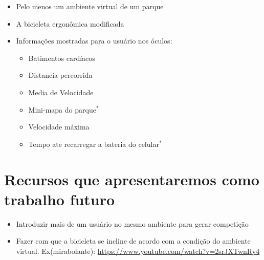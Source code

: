 \begin{itemize}
	\item Pelo menos um ambiente virtual de um parque
	\item A bicicleta ergonômica modificada
	\item Informações mostradas para o usuário nos óculos:
	\begin{itemize}
		\item Batimentos cardíacos
		\item Distancia percorrida
		\item Media de Velocidade
		\item Mini-mapa do parque$^*$
		\item Velocidade máxima
		\item Tempo ate recarregar a bateria do celular$^*$
	\end{itemize}
\end{itemize}

\section{Recursos que apresentaremos como trabalho futuro}

\begin{itemize}
	\item Introduzir mais de um usuário no mesmo ambiente para gerar competição
	\item Fazer com que a bicicleta se incline de acordo com a condição do ambiente virtual. Ex(mirabolante): \url{https://www.youtube.com/watch?v=2srJXTwnRy4}
\end{itemize}
